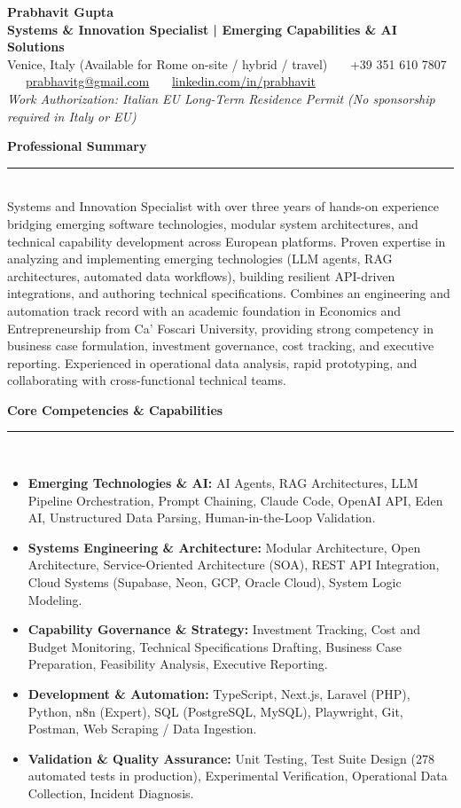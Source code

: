 \documentclass[10pt,a4paper]{article}
\newcommand{\cvsection}[1]{%
  \vspace{6pt}%
  {\large\bfseries\color{primary}#1}\\[-3pt]%
  {\color{linegray}\rule{\textwidth}{0.75pt}}\\[3pt]%
}
\begin{document}
\begin{center}
  {\Huge\bfseries\color{primary} Prabhavit Gupta}\\[4pt]
  {\large\bfseries\color{secondary} Systems \& Innovation Specialist | Emerging Capabilities \& AI Solutions}\\[4pt]
  Venice, Italy (Available for Rome on-site / hybrid / travel) \ \textbullet\ \ +39 351 610 7807 \ \textbullet\ \ \href{mailto:prabhavitg@gmail.com}{prabhavitg@gmail.com} \ \textbullet\ \ \href{https://www.linkedin.com/in/prabhavit/}{linkedin.com/in/prabhavit}\\[2pt]
  \textit{\small Work Authorization: Italian EU Long-Term Residence Permit (No sponsorship required in Italy or EU)}
\end{center}

\vspace{-4pt}

\cvsection{Professional Summary}
Systems and Innovation Specialist with over three years of hands-on experience bridging emerging software technologies, modular system architectures, and technical capability development across European platforms. Proven expertise in analyzing and implementing emerging technologies (LLM agents, RAG architectures, automated data workflows), building resilient API-driven integrations, and authoring technical specifications. Combines an engineering and automation track record with an academic foundation in Economics and Entrepreneurship from Ca' Foscari University, providing strong competency in business case formulation, investment governance, cost tracking, and executive reporting. Experienced in operational data analysis, rapid prototyping, and collaborating with cross-functional technical teams.

\cvsection{Core Competencies \& Capabilities}
\begin{itemize}
  \item \textbf{Emerging Technologies \& AI:} AI Agents, RAG Architectures, LLM Pipeline Orchestration, Prompt Chaining, Claude Code, OpenAI API, Eden AI, Unstructured Data Parsing, Human-in-the-Loop Validation.
  \item \textbf{Systems Engineering \& Architecture:} Modular Architecture, Open Architecture, Service-Oriented Architecture (SOA), REST API Integration, Cloud Systems (Supabase, Neon, GCP, Oracle Cloud), System Logic Modeling.
  \item \textbf{Capability Governance \& Strategy:} Investment Tracking, Cost and Budget Monitoring, Technical Specifications Drafting, Business Case Preparation, Feasibility Analysis, Executive Reporting.
  \item \textbf{Development \& Automation:} TypeScript, Next.js, Laravel (PHP), Python, n8n (Expert), SQL (PostgreSQL, MySQL), Playwright, Git, Postman, Web Scraping / Data Ingestion.
  \item \textbf{Validation \& Quality Assurance:} Unit Testing, Test Suite Design (278 automated tests in production), Experimental Verification, Operational Data Collection, Incident Diagnosis.
\end{itemize}
\end{document}
